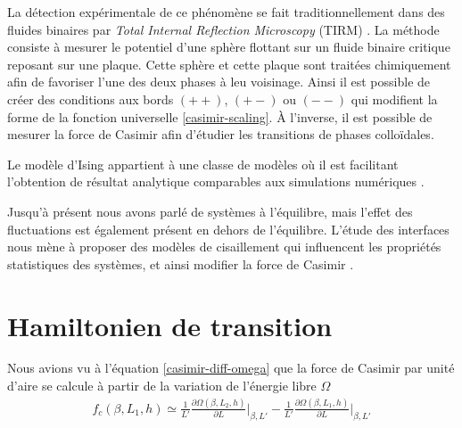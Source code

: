 La détection expérimentale de ce phénomène se fait traditionnellement dans des fluides binaires par \textit{Total Internal Reflection Microscopy} (TIRM) \cite{fukuto_critical_2005,hertlein_direct_2008,gambassi_critical_2009,edison_critical_2015-1}. La méthode consiste à mesurer le potentiel d'une sphère flottant sur un fluide binaire critique reposant sur une plaque. Cette sphère et cette plaque sont traitées chimiquement afin de favoriser l'une des deux phases à leu voisinage. Ainsi il est possible de créer des conditions aux bords $(++)$, $(+-)$ ou $(--)$ qui modifient la forme de la fonction universelle \ref{casimir-scaling}. À l'inverse, il est possible de mesurer la force de Casimir \cite{nguyen_controlling_2013} afin d'étudier les transitions de phases colloïdales.

Le modèle d'Ising appartient à une classe de modèles où il est facilitant l'obtention de résultat analytique \cite{hobrecht_critical_2017} comparables aux simulations numériques \cite{vasilyev_monte_2007,vasilyev_universal_2009,cardozo_finite_2015}.

Jusqu'à présent nous avons parlé de systèmes à l'équilibre, mais l'effet des fluctuations est également présent en dehors de l'équilibre. L'étude des interfaces nous mène à proposer des modèles de cisaillement qui influencent les propriétés statistiques des systèmes, et ainsi modifier la force de Casimir \cite{dean_out--equilibrium_2010}.


\section{Hamiltonien de transition}
\label{sec-transition}

Nous avions vu à l'équation \ref{casimir-diff-omega} que la force de Casimir par unité d'aire se calcule à partir de la variation de l'énergie libre $\Omega$
\begin{align}
    f_c(\beta,L_1,h) \simeq \frac{1}{L' }\frac{\partial \Omega(\beta,L_2,h)}{\partial L} \bigg|_{\beta,L'} -  \frac{1}{L' }\frac{\partial \Omega(\beta,L_1,h)}{\partial L} \bigg|_{\beta,L'}
\end{align}

